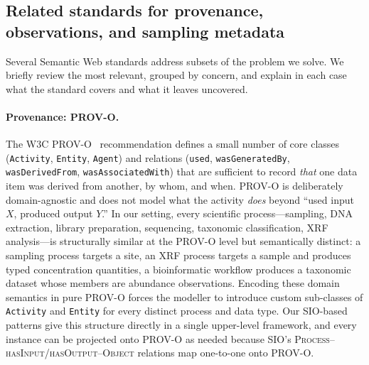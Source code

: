 \documentclass[11pt,a4paper]{article}
\begin{document}
\subsection{Related standards for provenance, observations, and
  sampling metadata}\label{subsec:related_standards}

Several Semantic Web standards address subsets of the problem we
solve. We briefly review the most relevant, grouped by concern, and
explain in each case what the standard covers and what it leaves
uncovered.

\paragraph{Provenance: PROV-O.}
The W3C PROV-O~\cite{provo} recommendation defines a small number of
core classes (\texttt{Activity}, \texttt{Entity}, \texttt{Agent}) and
relations (\texttt{used}, \texttt{wasGeneratedBy},
\texttt{wasDerivedFrom}, \texttt{wasAssociatedWith}) that are
sufficient to record \emph{that} one data item was derived from
another, by whom, and when. PROV-O is deliberately domain-agnostic
and does not model what the activity \emph{does} beyond
``used input $X$, produced output $Y$.'' In our setting, every
scientific process---sampling, DNA extraction, library preparation,
sequencing, taxonomic classification, XRF analysis---is structurally
similar at the PROV-O level but semantically distinct: a sampling
process targets a site, an XRF process targets a sample and produces
typed concentration quantities, a bioinformatic workflow produces a
taxonomic dataset whose members are abundance observations. Encoding
these domain semantics in pure PROV-O forces the modeller to introduce
custom sub-classes of \texttt{Activity} and \texttt{Entity} for every
distinct process and data type. Our SIO-based patterns give this
structure directly in a single upper-level framework, and every
instance can be projected onto PROV-O as needed because SIO's
\textsc{Process--hasInput/hasOutput--Object} relations map
one-to-one onto PROV-O.
\end{document}
